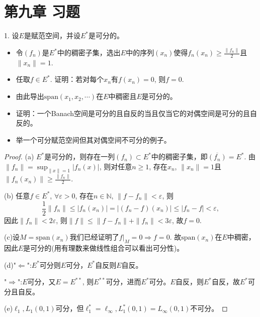 \documentclass[a4paper,8pt]{ctexart}\textwidth 140mm \textheight 216mm
\newcommand{\e}{\varepsilon}
\newcommand{\8}{\infty}
\newcommand{\RA}{\Rightarrow}
\newcommand{\LA}{\Leftarrow}
\begin{document}
\section{第九章 习题}
1. 设$E$是赋范空间，并设$E^*$是可分的。
\begin{itemize}
	\item[(a)] 令$(f_n)$是$E^*$中的稠密子集，选出$E$中的序列$(x_n)$使得$f_n(x_n)\geq \frac{\|f_n\|}{2}$且$\|x_n\|= 1$.
	\item[(b)] 任取$f\in E^*$. 证明：若对每个$x_n$有$f(x_n)=0$, 则$f=0$.
	\item[(c)] 由此导出$\mathrm{span}(x_1,x_2,\cdots)$在$E$中稠密且$E$是可分的。
	\item[(d)] 证明：一个Banach空间是可分的且自反的当且仅当它的对偶空间是可分的且自反的。
	\item[(e)] 举一个可分赋范空间但其对偶空间不可分的例子。
\end{itemize}
\begin{proof}
	(a) $E^*$是可分的，则存在一列$(f_n)\subset E^*$中的稠密子集，即$\overline{(f_n)}=E^*$.  由$\|f_n\|=\sup_{\|x\|=1}|f_n(x)|$, 则对任意$n\geq 1$, 存在$x_n$, $\|x_n\|=1$且$\|f_n(x_n)\|\geq \frac{\|f_n\|}{2}$. 
	
	(b) 任意$f\in E^*$, $\forall \e>0$, 存在$n\in\mathbb{N}$, $\|f-f_n\|<\e$, 则
	$$\frac{1}{2}\|f_n\|\leq |f_n(x_n)|=|(f_n-f)(x_n)|\leq|f_n-f|<\e,$$
	因此$\|f_n\|<2\e$, 则$\|f\|\leq\|f-f_n\|+\|f_n\|<3\e$, 故$f=0$.
	
	(c)设$M=\mathrm{span}(x_n)$我们已经证明了$f|_M=0\Rightarrow f=0$. 故$\mathrm{span}(x_n)$在$E$中稠密，因此$E$是可分的(用有理数来做线性组合可以看出可分性)。 
	
	(d)"$\LA$":$E^*$可分则$E$可分，$E^*$自反则$E$自反。
	
	"$\RA$":$E$可分，又$E=E^{**}$, 则$E^{**}$可分，进而$E^*$可分。$E$自反，则$E^*$自反，故$E^*$可分且自反。
	
	(e)$\ell_1,L_1(0,1)$可分，但$\ell_1^*=\ell_\infty,L_1^*(0,1)=L_\infty(0,1)$不可分。
\end{proof}
\end{document}

